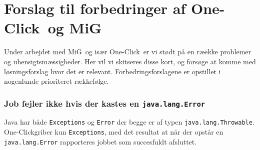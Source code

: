 \documentclass[draft,a4paper,11pt]{article}
\newcommand{\mig}{MiG}
\newcommand{\oc}{One-Click}
\begin{document}




\section{Forslag til forbedringer af \oc\ og \mig}\label{forbedringer}

Under arbejdet med \mig\ og især \oc\ er vi stødt på en ræekke problemer og uhensigtsmæssigheder. Her vil vi skitseres disse kort, og forsøge at komme med løsningsforslag hvor det er relevant. Forbedringsforslagene er opstillet i nogenlunde prioriteret rækkefølge.

\subsubsection*{Job fejler ikke hvis der kastes en \texttt{java.lang.Error}}
Java har både \texttt{Exceptions} og \texttt{Error} der begge er af typen \texttt{java.lang.Throwable}. \oc griber kun \texttt{Exceptions}, med det resultat at når der opstår en \texttt{java.lang.Error} rapporteres jobbet som succesfuldt afsluttet. 
\end{document}
